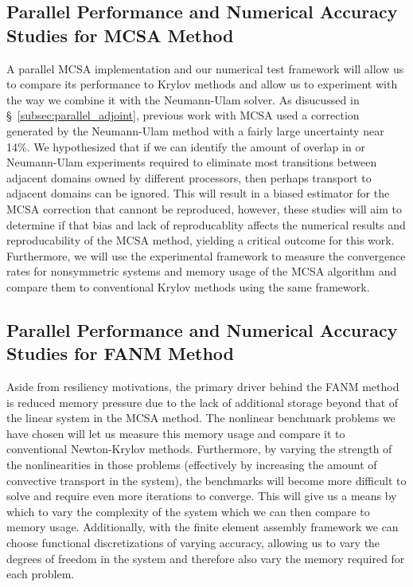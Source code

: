 \subsection{Parallel Performance and Numerical Accuracy Studies for MCSA
  Method}
\label{subsec:mcsa_studies}
A parallel MCSA implementation and our numerical test framework will
allow us to compare its performance to Krylov methods and allow us to
experiment with the way we combine it with the Neumann-Ulam solver. As
disucussed in \S~\ref{subsec:parallel_adjoint}, previous work with
MCSA used a correction generated by the Neumann-Ulam method with a
fairly large uncertainty near 14\%. We hypothesized that if we can
identify the amount of overlap in or Neumann-Ulam experiments required
to eliminate most transitions between adjacent domains owned by
different processors, then perhaps transport to adjacent domains can
be ignored. This will result in a biased estimator for the MCSA
correction that cannont be reproduced, however, these studies will aim
to determine if that bias and lack of reproducablity affects the
numerical results and reproducability of the MCSA method, yielding a
critical outcome for this work. Furthermore, we will use the
experimental framework to measure the convergence rates for
nonsymmetric systems and memory usage of the MCSA algorithm and
compare them to conventional Krylov methods using the same framework.

\subsection{Parallel Performance and Numerical Accuracy Studies for FANM
  Method}
\label{subsec:fanm_studies}
Aside from resiliency motivations, the primary driver behind the FANM
method is reduced memory pressure due to the lack of additional
storage beyond that of the linear system in the MCSA method. The
nonlinear benchmark problems we have chosen will let us measure this
memory usage and compare it to conventional Newton-Krylov
methods. Furthermore, by varying the strength of the nonlinearities in
those problems (effectively by increasing the amount of convective
transport in the system), the benchmarks will become more difficult to
solve and require even more iterations to converge. This will give us
a means by which to vary the complexity of the system which we can
then compare to memory usage. Additionally, with the finite element
assembly framework we can choose functional discretizations of varying
accuracy, allowing us to vary the degrees of freedom in the system and
therefore also vary the memory required for each problem.

